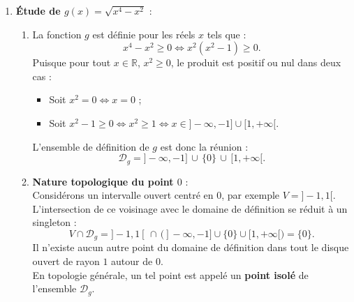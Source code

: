 \documentclass[11pt,a4paper]{article}
\newcommand{\R}{\mathbb{R}}
\begin{document}
\begin{correctionbox}
\begin{enumerate}[label=\textbf{\arabic*.}]
\begin{enumerate}[label=\alph*.]
        \item \textbf{Interprétation géométrique} :\\
        Au point $A(1, 0)$, la courbe représentative $\mathcal{C}_f$ admet une \textbf{demi-tangente verticale} orientée vers le haut, d'équation :
        \[
        x = 1 \quad (\text{avec } y \ge 0).
        \]
    \end{enumerate}

    \item \textbf{Étude de $g(x) = \sqrt{x^4 - x^2}$} :
    \begin{enumerate}[label=\alph*.]
        \item La fonction $g$ est définie pour les réels $x$ tels que :
        \[
        x^4 - x^2 \ge 0 \iff x^2(x^2 - 1) \ge 0.
        \]
        Puisque pour tout $x \in \R$, $x^2 \ge 0$, le produit est positif ou nul dans deux cas :
        \begin{itemize}
            \item Soit $x^2 = 0 \iff x = 0$ ;
            \item Soit $x^2 - 1 \ge 0 \iff x^2 \ge 1 \iff x \in ]-\infty, -1] \cup [1, +\infty[$.
        \end{itemize}
        L'ensemble de définition de $g$ est donc la réunion :
        \[
        \mathcal{D}_g = ]-\infty, -1] \, \cup \, \{0\} \, \cup \, [1, +\infty[.
        \]

        \item \textbf{Nature topologique du point $0$} :\\
        Considérons un intervalle ouvert centré en $0$, par exemple $V = ]-1, 1[$.\\
        L'intersection de ce voisinage avec le domaine de définition se réduit à un singleton :
        \[
        V \cap \mathcal{D}_g = ]-1, 1[ \, \cap \, \big( ]-\infty, -1] \cup \{0\} \cup [1, +\infty[ \big) = \{0\}.
        \]
        Il n'existe aucun autre point du domaine de définition dans tout le disque ouvert de rayon $1$ autour de $0$.\\
        En topologie générale, un tel point est appelé un \textbf{point isolé} de l'ensemble $\mathcal{D}_g$.


\end{enumerate}
\end{enumerate}
\end{correctionbox}
\end{document}
